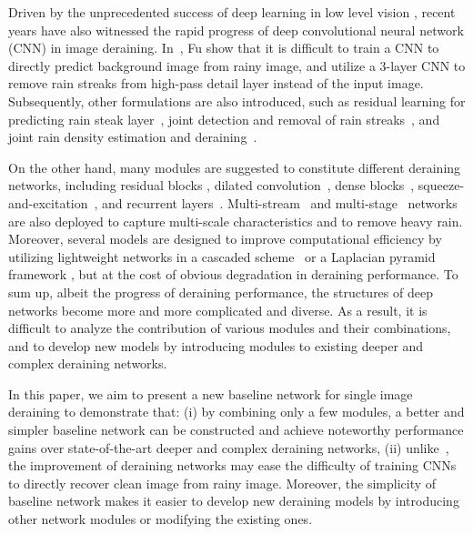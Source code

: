 \documentclass[10pt,twocolumn,letterpaper]{article}
\begin{document}
Driven by the unprecedented success of deep learning in low level vision \cite{zhang2017beyond,dong2016image,ledig2017photo,kim2016deeply,tai2017image}, recent years have also witnessed the rapid progress of deep convolutional neural network (CNN) in image deraining.
In~\cite{fu2017clearing}, Fu \etal show that it is difficult to train a CNN to directly predict background image from rainy image, and utilize a 3-layer CNN to remove rain streaks from high-pass detail layer instead of the input image.
Subsequently, other formulations are also introduced, such as residual learning for predicting rain steak layer~\cite{li2018recurrent}, joint detection and removal of rain streaks~\cite{yang2017deep}, and joint rain density estimation and deraining~\cite{zhang2018density}.



On the other hand, many modules are suggested to constitute different deraining networks, including residual blocks \cite{fu2017removing,he2016deep}, dilated convolution~\cite{yu2016multi,yang2017deep}, dense blocks~\cite{zhang2018density}, squeeze-and-excitation~\cite{li2018recurrent}, and recurrent layers~\cite{li2018recurrent,qian2018attentive}.
Multi-stream~\cite{zhang2018density} and multi-stage~\cite{li2018recurrent} networks are also deployed to capture multi-scale characteristics and to remove heavy rain.
Moreover, several models are designed to improve computational efficiency by utilizing lightweight networks in a cascaded scheme~\cite{fan2018residual} or a Laplacian pyramid framework \cite{fu2018lightweight}, but at the cost of obvious degradation in deraining performance.
To sum up, albeit the progress of deraining performance, the structures of deep networks become more
and more complicated and diverse.
As a result, it is difficult to analyze the contribution of various modules and their combinations, and to develop new models by introducing modules to existing deeper and complex deraining networks.






In this paper, we aim to present a new baseline network for single image deraining to demonstrate that:
(i) by combining only a few modules, a better and simpler baseline network can be constructed and achieve noteworthy performance gains over state-of-the-art deeper and complex deraining networks,
(ii) unlike~\cite{fu2017clearing}, the improvement of deraining networks may ease the difficulty of training CNNs to directly recover clean image from rainy image.
Moreover, the simplicity of baseline network makes it easier to develop new deraining models by introducing other network modules or modifying the existing ones.
\end{document}
